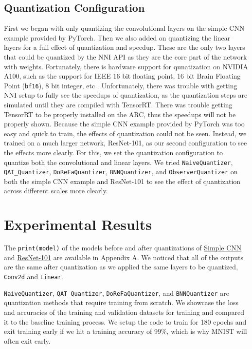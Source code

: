 \documentclass{article}
\begin{document}
\subsection{Quantization Configuration}
First we began with only quantizing the convolutional layers on the simple CNN example provided by PyTorch. Then we also added on quantizing the linear layers for a full effect of quantization and speedup. These are the only two layers that could be quantized by the NNI API as they are the core part of the network with weights. Fortunately, there is hardware support for qunatization on NVIDIA A100, such as the support for IEEE 16 bit floating point, 16 bit Brain Floating Point (\verb|bf16|), 8 bit integer, etc \cite{a100}. Unfortunately, there was trouble with getting NNI setup to fully see the speedups of quantization, as the quantization steps are simulated until they are compiled with TensorRT. There was trouble getting TensorRT to be properly installed on the ARC, thus the speedups will not be properly shown. Because the simple CNN example provided by PyTorch was too easy and quick to train, the effects of quantization could not be seen. Instead, we trained on a much larger network, ResNet-101, as our second configuration to see the effects more clearly. For this, we set the quantization configuration to quantize both the convolutional and linear layers. We tried \verb|NaiveQuantizer|, \verb|QAT_Quantizer|, \verb|DoReFaQuantizer|, \verb|BNNQuantizer|, and \verb|ObserverQuantizer| on both the simple CNN example and ResNet-101 to see the effect of quantization across different scales more clearly.

\section{Experimental Results}

The \verb|print(model)| of the models before and after quantizations of \hyperref[sec:A1]{Simple CNN} and \hyperref[sec:A2]{ResNet-101} are available in Appendix A. We noticed that all of the outputs are the same after quantization as we applied the same layers to be quantized, \verb|Conv2d| and \verb|Linear|.

\verb|NaiveQuantizer|, \verb|QAT_Quantizer|, \verb|DoReFaQuantizer|, and \verb|BNNQuantizer| are quantization methods that require training from scratch. We showcase the loss and accuracies of the training and validation datasets for training and compared it to the baseline training process. We setup the code to train for 180 epochs and exit training early if we hit a training accuracy of 99\%, which is why MNIST will often exit early. 
\end{document}
